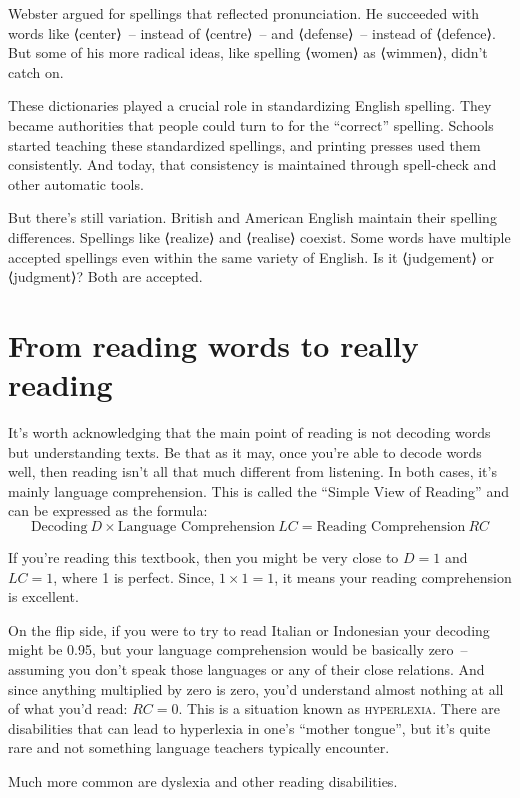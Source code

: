 Webster argued for spellings that reflected pronunciation. He succeeded with words like ⟨center⟩~-- instead of ⟨centre⟩~-- and ⟨defense⟩~-- instead of ⟨defence⟩. But some of his more radical ideas, like spelling ⟨women⟩ as ⟨wimmen⟩, didn't catch on.

These dictionaries played a crucial role in standardizing English spelling. They became authorities that people could turn to for the ``correct'' spelling. Schools started teaching these standardized spellings, and printing presses used them consistently. And today, that consistency is maintained through spell-check and other automatic tools.

But there's still variation. British and American English maintain their spelling differences. Spellings like ⟨realize⟩ and ⟨realise⟩ coexist. Some words have multiple accepted spellings even within the same variety of English. Is it ⟨judgement⟩ or ⟨judgment⟩? Both are accepted.

\section{From reading words to really reading}

It's worth acknowledging that the main point of reading is not decoding words but understanding texts. Be that as it may, once you're able to decode words well, then reading isn't all that much different from listening. In both cases, it's mainly language comprehension. This is called the ``Simple View of Reading'' and can be expressed as the formula:
\[
\text{Decoding}~D \times \text{Language Comprehension}~LC = \text{Reading Comprehension}~RC
\]

If you're reading this textbook, then you might be very close to $D=1$ and $LC=1$, where 1 is perfect. Since, $1\times1=1$, it means your reading comprehension is excellent. 

On the flip side, if you were to try to read Italian or Indonesian  your decoding might be 0.95, but your language comprehension would be basically zero~-- assuming you don't speak those languages or any of their close relations. And since anything multiplied by zero is zero, you'd understand almost nothing at all of what you'd read: $RC=0$. This is a situation known as \textsc{hyperlexia}. There are disabilities that can lead to hyperlexia in one's ``mother tongue'', but it's quite rare and not something language teachers typically encounter.

Much more common are dyslexia and other reading disabilities.

